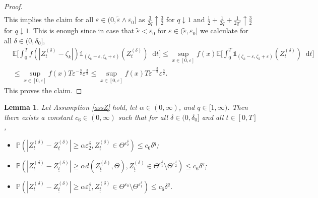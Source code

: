 \documentclass[11pt,a4paper]{article}
\makeatletter
\def\namedlabel#1#2{\begingroup
    #2%
    \def\@currentlabel{#2}%
    \phantomsection\label{#1}\endgroup
}
\numberwithin{equation}{section}
\newtheorem{lemma}[theorem]{Lemma}
\theoremstyle{definition}
\newcommand{\E}{{\mathbb{E}}}
\renewcommand{\P}{{\mathbb{P}}}
\newcommand{\diff}{\mathop{}\!\mathrm{d}}
\makeatother
\begin{document}
\begin{proof}
\begin{equation}
\begin{aligned}
    \end{aligned}
\end{equation}
This implies the claim for all $\varepsilon\in(0,\widetilde \varepsilon\wedge \varepsilon_0]$ as $\frac{3}{2q} \uparrow \frac{3}{2}$ for $q \downarrow 1$ and  $\frac{1}{2} + \frac{1}{2q} +\frac{1}{2q^2} \uparrow \frac{3}{2}$ for $q \downarrow 1$.
This is enough since in case that $\widetilde \varepsilon< \varepsilon_0 $ for  $\varepsilon\in(\widetilde \varepsilon,\varepsilon_0]$ we calculate for all $\delta\in(0,\delta_0]$,
\begin{equation}\label{pOTE34}
    \begin{aligned}
        &\E\Big[\int_0^T f(|Z^{(\delta)}_{t}-\zeta_k|)\mathds{1}_{(\zeta_k-\varepsilon, \zeta_k+\varepsilon)}(Z^{(\delta)}_{t}) \diff 
        t \Big]
        \leq \sup_{x\in[0,\varepsilon]} f(x) \E\Big[\int_0^T \mathds{1}_{(\zeta_k-\varepsilon, \zeta_k+\varepsilon)}(Z^{(\delta)}_{t}) \diff 
        t \Big]\\
        &\leq \sup_{x\in[0,\varepsilon]} f(x) T \varepsilon^{-\frac{3}{2}}  \varepsilon^{\frac{3}{2}} 
        \leq \sup_{x\in[0,\varepsilon]} f(x) T \widetilde \varepsilon^{-\frac{3}{2}}  \varepsilon^{\frac{3}{2}}.
    \end{aligned}
\end{equation}
This proves the claim.
\end{proof}
\newpage

\begin{lemma}\label{LemProbEst}
    Let Assumption \ref{assZ} hold, let $\alpha \in(0,\infty)$, and $q\in[1,\infty)$. Then there exists a constant $c_6 \in(0,\infty)$ such that for all $\delta\in(0,\delta_0]$ and all $t\in[0,T]$,
    \begin{itemize}
        \item[\namedlabel{ProbEsti}{(i)}] $\P(|Z^{(\delta)}_{t} -Z^{(\delta)}_{\underline{t}} | \geq \alpha \varepsilon_2^\delta, Z^{(\delta)}_{\underline{t}} \in \Theta^{\varepsilon_2^\delta}) \leq c_6 \delta^q$;
        \item[\namedlabel{ProbEstii}{(ii)}] $\P(|Z^{(\delta)}_{t} -Z^{(\delta)}_{\underline{t}} | \geq \alpha d( Z^{(\delta)}_{\underline{t}},\Theta),  Z^{(\delta)}_{\underline{t}} \in \Theta^{\varepsilon_1^\delta}\setminus \Theta^{\varepsilon_2^\delta}) \leq c_6 \delta^q$;
        \item[\namedlabel{ProbEstiii}{(iii)}] $\P(|Z^{(\delta)}_{t} -Z^{(\delta)}_{\underline{t}} | \geq \alpha\varepsilon_1^\delta,   Z^{(\delta)}_{\underline{t}} \in \Theta^{\varepsilon_0}\setminus \Theta^{\varepsilon_1^\delta}) \leq c_6 \delta^q$.
    \end{itemize}
\end{lemma}
\end{document}
